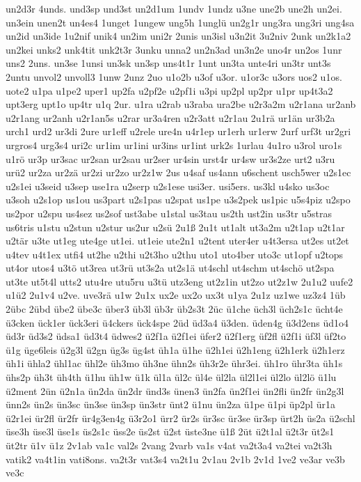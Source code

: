 {un2d3r
4unds.
und3sp
und3st
un2d1um
1undv
1undz
u3ne
une2b
une2h
un2ei.
un3ein
unen2t
un4es4
1unget
1ungew
ung5h
1unglü
un2g1r
ung3ra
ung3ri
ung4sa
un2id
un3ide
1u2nif
unik4
un2im
uni2r
2unis
un3isl
u3n2it
3u2niv
2unk
un2k1a2
un2kei
unks2
unk4tit
unk2t3r
3unku
unna2
un2n3ad
un3n2e
uno4r
un2os
1unr
uns2
2uns.
un3se
1unsi
un3sk
un3sp
uns4t1r
1unt
un3ta
unte4ri
un3tr
unt3s
2untu
unvol2
unvoll3
1unw
2unz
2uo
u1o2b
u3of
u3or.
u1or3c
u3ors
uos2
u1os.
uote2
u1pa
u1pe2
uper1
up2fa
u2pf2e
u2pf1i
u3pi
up2pl
up2pr
u1pr
up4t3a2
upt3erg
upt1o
up4tr
u1q
2ur.
u1ra
u2rab
u3raba
ura2be
u2r3a2m
u2r1ana
ur2anb
u2r1ang
ur2anh
u2r1an5s
u2rar
ur3a4ren
u2r3att
u2r1au
2u1rä
ur1än
ur3b2a
urch1
urd2
ur3di
2ure
ur1eff
u2rele
ure4n
u4r1ep
ur1erh
ur1erw
2urf
urf3t
ur2gri
urgros4
urg3s4
uri2c
ur1im
ur1ini
ur3ins
ur1int
urk2s
1urlau
4u1ro
u3rol
uro1s
u1rö
ur3p
ur3sac
ur2san
ur2sau
ur2ser
ur4sin
urst4r
ur4sw
ur3s2ze
urt2
u3ru
urü2
ur2za
ur2zä
ur2zi
ur2zo
ur2z1w
2us
u4saf
us4ann
u6schent
usch5wer
u2s1ec
u2s1ei
u3seid
u3sep
use1ra
u2serp
u2s1ese
usi3er.
usi5ers.
us3kl
u4sko
us3oc
u3soh
u2s1op
us1ou
us3part
u2s1pas
u2spat
us1pe
u3s2pek
us1pic
u5s4piz
u2spo
us2por
u2spu
us4sez
us2sof
ust3abe
u1stal
us3tau
us2th
ust2in
us3tr
u5stras
us6tris
u1stu
u2stun
u2stur
us2ur
u2sü
2u1ß
2u1t
ut1alt
ut3a2m
u2t1ap
u2t1ar
u2tär
u3te
ut1eg
ute4ge
ut1ei.
ut1eie
ute2n1
u2tent
uter4er
u4t3ersa
ut2es
ut2et
u4tev
u4t1ex
utfi4
ut2he
u2thi
u2t3ho
u2thu
uto1
uto4ber
uto3c
ut1opf
u2tops
ut4or
utos4
u3tö
ut3rea
ut3rü
ut3s2a
ut2s1ä
ut4schl
ut4schm
ut4schö
ut2spa
ut3te
ut5t4l
utts2
utu4re
utu5ru
u3tü
utz3eng
ut2z1in
ut2zo
ut2z1w
2u1u2
uufe2
u1ü2
2u1v4
u2ve.
uve3rä
u1w
2u1x
ux2e
ux2o
ux3t
u1ya
2u1z
uz1we
uz3z4
1üb
2übc
2übd
übe2
übe3c
über3
üb3l
üb3r
üb2s3t
2üc
ü1che
üch3l
üch2s1c
ücht4e
ü3cken
ück1er
ück3eri
ü4ckers
ück4spe
2üd
üd3a4
ü3den.
üden4g
ü3d2ens
üd1o4
üd3r
üd3s2
üdsa1
üd3t4
üdwes2
ü2f1a
ü2f1ei
üfer2
ü2f1erg
üf2fl
ü2f1i
üf3l
üf2to
ü1g
üge6leis
ü2g3l
ü2gn
üg3s
üg4st
üh1a
ü1he
ü2h1ei
ü2h1eng
ü2h1erk
ü2h1erz
üh1i
ühla2
ühl1ac
ühl2e
üh3mo
üh3ne
ühn2s
üh3r2e
ühr3ei.
üh1ro
ühr3ta
üh1s
ühs2p
üh3t
üh4th
ü1hu
üh1w
ü1k
ül1a
ül2c
ül4e
ül2la
ül2l1ei
ül2lo
ül2lö
ü1lu
ü2ment
2ün
ü2n1a
ün2da
ün2dr
ünd3s
ünen3
ün2fa
ün2f1ei
ün2fli
ün2fr
ün2g3l
ünn2s
ün2s
ün3sc
ün3se
ün3sp
ün3str
ünt2
ü1nu
ün2za
ü1pe
ü1pi
üp2pl
ür1a
ü2r1ei
ür2fl
ür2fr
ür4g3en4g
ü3r2o1
ürr2
ür2s
ür3sc
ür3se
ür3sp
ürt2h
üs2a
ü2schl
üse3h
üse3l
üse1s
üs2s1c
üss2e
üs2st
ü2st
üste3ne
ü1ß
2üt
ü2t1al
ü2t3r
üt2s1
üt2tr
ü1v
ü1z
2v1ab
va1c
val2s
2vang
2varb
va1s
v4at
va2t3a4
va2tei
va2t3h
vatik2
va4t1in
vati8ons.
va2t3r
vat3s4
va2t1u
2v1au
2v1b
2v1d
1ve2
ve3ar
ve3b
ve3c
}
